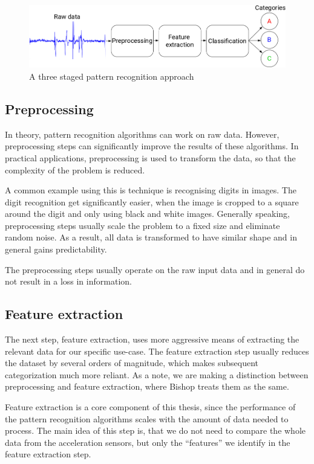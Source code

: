\begin{figure}
    \centering
    \includegraphics[width=\textwidth]{figures/PatternRecognitionSteps.png}
    \caption{A three staged pattern recognition approach}
    \label{fig:patternrecognitionsteps}
\end{figure}

\subsection{Preprocessing}
In theory, pattern recognition algorithms can work on raw data. However, preprocessing steps can significantly improve the results of these algorithms. In practical applications, preprocessing is used to transform the data, so that the complexity of the problem is reduced. 

A common example using this is technique is recognising digits in images. The digit recognition get significantly easier, when the image is cropped to a square around the digit and only using black and white images. Generally speaking, preprocessing steps usually scale the problem to a fixed size and eliminate random noise. As a result, all data is transformed to have similar shape and in general gains predictability.

The preprocessing steps usually operate on the raw input data and in general do not result in a loss in information.

\subsection{Feature extraction}
The next step, feature extraction, uses more aggressive means of extracting the relevant data for our specific use-case. The feature extraction step usually reduces the dataset by several orders of magnitude, which makes subsequent categorization much more reliant. As a note, we are making a distinction between preprocessing and feature extraction, where Bishop\cite{bishop2006pattern} treats them as the same.

Feature extraction is a core component of this thesis, since the performance of the pattern recognition algorithms scales with the amount of data needed to process. The main idea of this step is, that we do not need to compare the whole data from the acceleration sensors, but only the ``features'' we identify in the feature extraction step.

